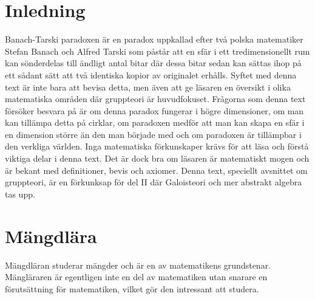 \documentclass{article}
\theoremstyle{definition}
\begin{document}
\section{Inledning}
Banach-Tarski paradoxen är en paradox uppkallad efter två polska matematiker Stefan Banach och Alfred Tarski
som påstår att en sfär i ett tredimensionellt rum kan sönderdelas till ändligt antal bitar
där dessa bitar sedan kan sättas ihop på ett sådant sätt att två identiska kopior av originalet erhålls. Syftet med denna text är 
inte bara att bevisa detta, men även att ge läsaren en översikt i olika matematiska områden där gruppteori är huvudfokuset.
Frågorna som denna text försöker besvara på är om denna paradox fungerar i högre dimensioner, om man kan tillämpa detta på cirklar, om paradoxen 
medför att man kan skapa en sfär i en dimension större än den man började med och om paradoxen är tillämpbar i den verkliga världen.
Inga matematiska förkunskaper krävs för att läsa och förstå viktiga delar i denna text. Det är dock bra om läsaren är matematiskt mogen 
och är bekant med definitioner, bevis och axiomer. Denna text, speciellt avsnittet om gruppteori, är en förkunksap för del II
där Galoisteori och mer abstrakt algebra tas upp.




\section{Mängdlära}
Mängdläran studerar mängder och är en av matematikens grundstenar. 
\linebreak
Mängläraren är egentligen inte en del av
matematiken utan snarare en förutsättning för matematiken, vilket gör den intressant att studera.
\end{document}
